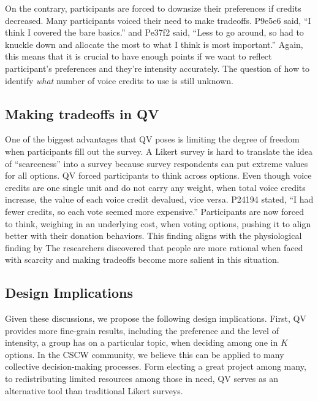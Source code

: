 On the contrary, participants are forced to downsize their preferences if credits decreased. Many participants voiced their need to make tradeoffs. P9e5e6 said, ``I think I covered the bare basics.'' and Pe37f2 said, ``Less to go around, so had to knuckle down and allocate the most to what I think is most important.'' 
Again, this means that it is crucial to have enough points if we want to reflect participant's preferences and they're intensity accurately.
The question of how to identify \textit{what} number of voice credits to use is still unknown.

\subsection{Making tradeoffs in QV}
One of the biggest advantages that QV poses is limiting the degree of freedom when participants fill out the survey.
A Likert survey is hard to translate the idea of ``scarceness'' into a survey because survey respondents can put extreme values for all options. 
QV forced participants to think across options. 
Even though voice credits are one single unit and do not carry any weight, when total voice credits increase, the value of each voice credit devalued, vice versa. P24194 stated, ``I had fewer credits, so each vote seemed more expensive.''
Participants are now forced to think, weighing in an underlying cost, when voting options, pushing it to align better with their donation behaviors.
This finding aligns with the physiological finding by \textcite{Shah2015a}
The researchers discovered that people are more rational when faced with scarcity and making tradeoffs become more salient in this situation.

\subsection{Design Implications}
Given these discussions,
we propose the following design implications.
First, QV provides more fine-grain results,
including the preference and the level of intensity,
a group has on a particular topic,
when deciding among one in $K$ options.
In the CSCW community,
we believe this can be applied to 
many collective decision-making processes.
Form electing a great project among many,
to redistributing limited resources among those in need,
QV serves as an alternative tool 
than traditional Likert surveys.

